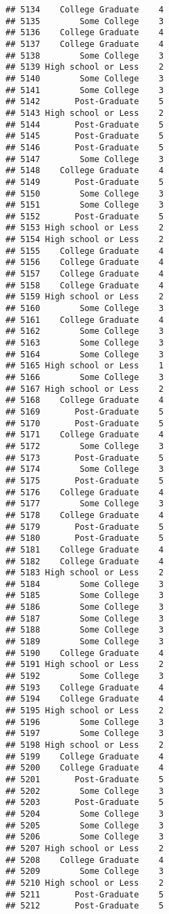 \documentclass[
]{article}
\begin{document}
\begin{verbatim}
## 5134    College Graduate    4
## 5135        Some College    3
## 5136    College Graduate    4
## 5137    College Graduate    4
## 5138        Some College    3
## 5139 High school or Less    2
## 5140        Some College    3
## 5141        Some College    3
## 5142       Post-Graduate    5
## 5143 High school or Less    2
## 5144       Post-Graduate    5
## 5145       Post-Graduate    5
## 5146       Post-Graduate    5
## 5147        Some College    3
## 5148    College Graduate    4
## 5149       Post-Graduate    5
## 5150        Some College    3
## 5151        Some College    3
## 5152       Post-Graduate    5
## 5153 High school or Less    2
## 5154 High school or Less    2
## 5155    College Graduate    4
## 5156    College Graduate    4
## 5157    College Graduate    4
## 5158    College Graduate    4
## 5159 High school or Less    2
## 5160        Some College    3
## 5161    College Graduate    4
## 5162        Some College    3
## 5163        Some College    3
## 5164        Some College    3
## 5165 High school or Less    1
## 5166        Some College    3
## 5167 High school or Less    2
## 5168    College Graduate    4
## 5169       Post-Graduate    5
## 5170       Post-Graduate    5
## 5171    College Graduate    4
## 5172        Some College    3
## 5173       Post-Graduate    5
## 5174        Some College    3
## 5175       Post-Graduate    5
## 5176    College Graduate    4
## 5177        Some College    3
## 5178    College Graduate    4
## 5179       Post-Graduate    5
## 5180       Post-Graduate    5
## 5181    College Graduate    4
## 5182    College Graduate    4
## 5183 High school or Less    2
## 5184        Some College    3
## 5185        Some College    3
## 5186        Some College    3
## 5187        Some College    3
## 5188        Some College    3
## 5189        Some College    3
## 5190    College Graduate    4
## 5191 High school or Less    2
## 5192        Some College    3
## 5193    College Graduate    4
## 5194    College Graduate    4
## 5195 High school or Less    2
## 5196        Some College    3
## 5197        Some College    3
## 5198 High school or Less    2
## 5199    College Graduate    4
## 5200    College Graduate    4
## 5201       Post-Graduate    5
## 5202        Some College    3
## 5203       Post-Graduate    5
## 5204        Some College    3
## 5205        Some College    3
## 5206        Some College    3
## 5207 High school or Less    2
## 5208    College Graduate    4
## 5209        Some College    3
## 5210 High school or Less    2
## 5211       Post-Graduate    5
## 5212       Post-Graduate    5

\end{verbatim}
\end{document}
